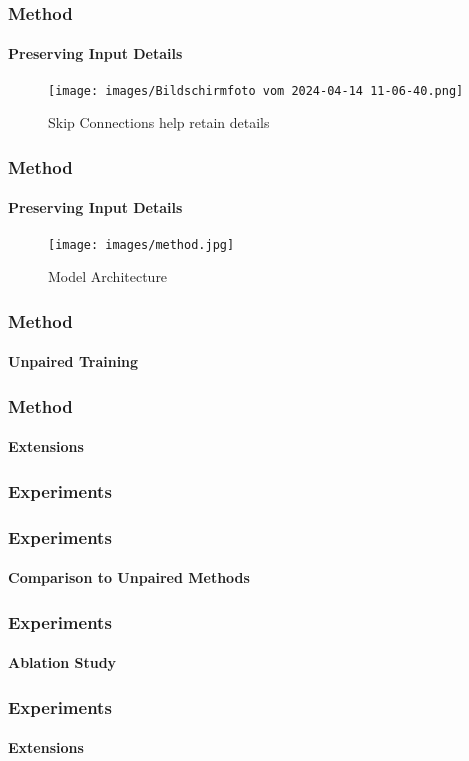\documentclass[aspectratio=169, lecture, amberg]{OTHAWbeamer}
\begin{document}
\begin{frame}
\frametitle{Method}
\framesubtitle{Preserving Input Details}
\begin{figure}
    \centering
    \texttt{[image: images/Bildschirmfoto vom 2024-04-14 11-06-40.png]}
    \caption{Skip Connections help retain details}
\end{figure}
\end{frame}

\begin{frame}
\frametitle{Method}
\framesubtitle{Preserving Input Details}
\begin{figure}
    \centering
    \texttt{[image: images/method.jpg]}
    \caption{Model Architecture}
\end{figure}
\end{frame}

\begin{frame}
\frametitle{Method}
\framesubtitle{Unpaired Training}

\end{frame}

\begin{frame}
\frametitle{Method}
\framesubtitle{Extensions}

\end{frame}

\begin{frame}
\frametitle{Experiments}

\end{frame}

\begin{frame}
\frametitle{Experiments}
\framesubtitle{Comparison to Unpaired Methods}

\end{frame}

\begin{frame}
\frametitle{Experiments}
\framesubtitle{Ablation Study}

\end{frame}

\begin{frame}
\frametitle{Experiments}
\framesubtitle{Extensions}

\end{frame}
\end{document}
